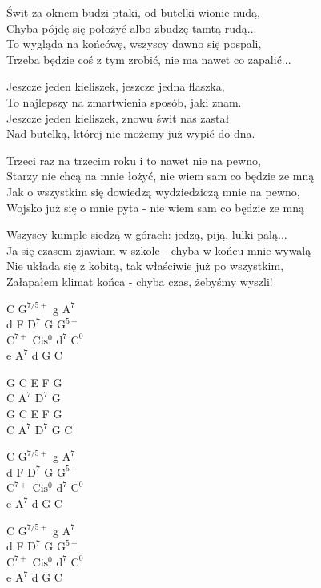 \begin{text}
    \footnotesize{
    Świt za oknem budzi ptaki, od butelki wionie nudą,\\
    Chyba pójdę się położyć albo zbudzę tamtą rudą...\\
    To wygląda na końcówę, wszyscy dawno się pospali,\\
    Trzeba będzie coś z tym zrobić, nie ma nawet co zapalić...

    \vin Jeszcze jeden kieliszek, jeszcze jedna flaszka,\\
    \vin To najlepszy na zmartwienia sposób, jaki znam.\\
    \vin Jeszcze jeden kieliszek, znowu świt nas zastał\\
    \vin Nad butelką, której nie możemy już wypić do dna.

    Trzeci raz na trzecim roku i to nawet nie na pewno,\\
    Starzy nie chcą na mnie łożyć, nie wiem sam co będzie ze mną\\
    Jak o wszystkim się dowiedzą wydziedziczą mnie na pewno,\\
    Wojsko już się o mnie pyta - nie wiem sam co będzie ze mną

    Wszyscy kumple siedzą w górach: jedzą, piją, lulki palą...\\
    Ja się czasem zjawiam w szkole - chyba w końcu mnie wywalą\\
    Nie układa się z kobitą, tak właściwie już po wszystkim,\\
    Załapałem klimat końca - chyba czas, żebyśmy wyszli!
    }
\end{text}
\begin{chord}
    \footnotesize{
    C $\mathrm{G^{7/5+}}$ g $\mathrm{A^7}$\\
    d F $\mathrm{D^7}$ G $\mathrm{G^{5+}}$\\
    $\mathrm{C^{7+}}$ $\mathrm{Cis^0}$ $\mathrm{d^7}$ $\mathrm{C^0}$\\
    e $\mathrm{A^7}$ d G C

    G C E F G\\
    C $\mathrm{A^7}$ $\mathrm{D^7}$ G\\
    G C E F G\\
    C $\mathrm{A^7}$ $\mathrm{D^7}$ G C

    C $\mathrm{G^{7/5+}}$ g $\mathrm{A^7}$\\
    d F $\mathrm{D^7}$ G $\mathrm{G^{5+}}$\\
    $\mathrm{C^{7+}}$ $\mathrm{Cis^0}$ $\mathrm{d^7}$ $\mathrm{C^0}$\\
    e $\mathrm{A^7}$ d G C

    C $\mathrm{G^{7/5+}}$ g $\mathrm{A^7}$\\
    d F $\mathrm{D^7}$ G $\mathrm{G^{5+}}$\\
    $\mathrm{C^{7+}}$ $\mathrm{Cis^0}$ $\mathrm{d^7}$ $\mathrm{C^0}$\\
    e $\mathrm{A^7}$ d G C
    }
\end{chord}
